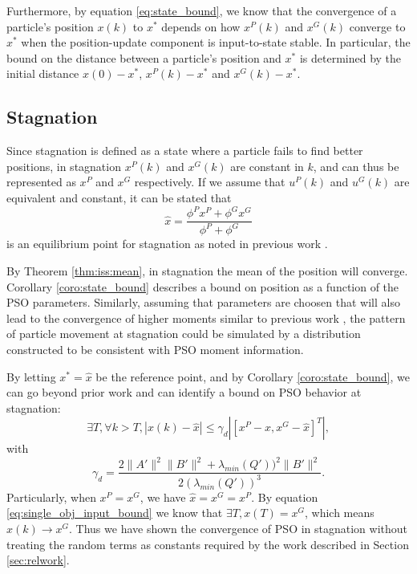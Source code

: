 \documentclass{sig-alternate}
\begin{document}
Furthermore, by equation \eqref{eq:state_bound}, we know that the convergence of a particle's position $ x(k) $ to $ x^{*} $ depends on how $ x^{P}(k) $ and $ x^{G}(k) $ converge to $ x^{*} $ when the position-update component is input-to-state stable.
In particular, the bound on the distance between a particle's position and  $ x^{*} $ is determined by the initial distance $ x(0) -  x^{*} $, $ x^{P}(k) -  x^{*} $ and $ x^{G}(k) -  x^{*} $.

\subsection{Stagnation}

Since stagnation is defined as a state where a particle fails to find better positions, in stagnation $ x^{P}(k) $ and $ x^{G}(k) $ are constant in $ k $, and can thus be represented as $ x^{P} $ and $ x^{G} $ respectively.
If we assume that $ u^{P}(k) $ and $ u^{G}(k) $ are equivalent and constant, it can be stated that
\begin{equation}
\label{eq:single_obj_equilibrium}
\hat{x} = \frac{\phi^{P} x^{P} + \phi^{G} x^{G} }{ \phi^{P} + \phi^{G} } 
\end{equation}
is an equilibrium point for stagnation as noted in previous work \cite{985692}.

By Theorem \ref{thm:iss:mean}, in stagnation the mean of the position will converge.
Corollary \ref{coro:state_bound} describes a bound on position as a function of the PSO parameters.
Similarly, assuming that parameters are choosen that will also lead to the convergence of higher moments similar to previous work \cite{Jiang20078, Poli:2007:EAS:1276958.1276977}, the pattern of particle movement at stagnation could be simulated by a distribution constructed to be consistent with PSO moment information\cite{Poli:2007:EAS:1276958.1276977}.

By letting $ x^{*} = \hat{x} $ be the reference point, and
by Corollary \ref{coro:state_bound}, we can go beyond prior work and can identify a bound on PSO behavior at stagnation:
\begin{equation}
\label{eq:single_obj_input_bound}
\exists T, \forall k > T, 
| x(k) - \hat{x} | \leq  \gamma_{d} | [ x^{P} - \hat{x}, x^{G} - \hat{x} ]^{T} |,
\end{equation}
with 
\begin{equation}
\gamma_{d} = \frac{ 2 \lVert A' \rVert^{2} \lVert B' \rVert^{2} + \lambda_{min}(Q') )^{2} \lVert B' \rVert^{2} }{ 2( \lambda_{min}(Q') )^{3} }.
\end{equation}
Particularly, when $ x^{P} = x^{G} $, we have
$ \hat{x} = x^{G} = x^{P} $.
By equation \eqref{eq:single_obj_input_bound} we know that
$ \exists T , x(T) = x^{G} $, 
which means $ x(k) \rightarrow x^{G} $.
Thus we have shown the convergence of PSO in stagnation without treating the random terms as constants required by the work described in Section \ref{sec:relwork}.
\end{document}
